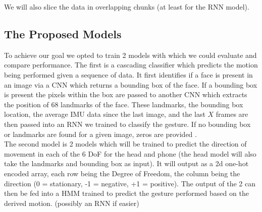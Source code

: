 We will also slice the data in overlapping chunks (at least for the RNN model).



\subsection{The Proposed Models} %
%
To achieve our goal we opted to train 2 models with which we could evaluate and compare performance.
The first is a cascading classifier which predicts the motion being performed given a sequence of data.
It first identifies if a face is present in an image via a CNN which returns a bounding box of the face\cite{yu2022yunet}. If a bounding box is present the pixels within the box are passed to another CNN which extracts the position of 68 landmarks of the face\cite{guobing2021headpose}.
These landmarks, the bounding box location, the average IMU data since the last image, and the last $X$ frames are then passed into an RNN we trained to classify the gesture.
If no bounding box or landmarks are found for a given image, zeros are provided .
\\
The second model is 2 models which will be trained to predict the direction of movement in each of the 6 DoF for the head and phone (the head model will also take the landmarks and bounding box as input).
It will output as a 2d one-hot encoded array, each row being the Degree of Freedom, the column being the direction (0 = stationary, -1 = negative, +1 = positive).
The output of the 2 can then be fed into a HMM trained to predict the gesture performed based on the derived motion. (possibly an RNN if easier)

